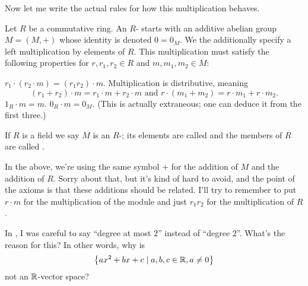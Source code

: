 Now let me write the actual rules for how this multiplication behaves.
\begin{definition}
	Let $R$ be a commutative ring.
	An $R$- starts with an additive abelian group $M = (M,+)$
	whose identity is denoted $0 = 0_M$.
	We the additionally specify a left multiplication by elements of $R$.
	This multiplication must satisfy the following properties
	for $r, r_1, r_2 \in R$ and $m, m_1, m_2 \in M$:
	\begin{enumerate}[(i)]
		\ii $r_1 \cdot (r_2 \cdot m) = (r_1r_2) \cdot m$.
		\ii Multiplication is distributive, meaning
		\[ (r_1+r_2) \cdot m = r_1 \cdot m + r_2 \cdot m
			\text{ and }
			r \cdot (m_1 + m_2) = r \cdot m_1 + r \cdot m_2. \]
		\ii $1_R \cdot m = m$.
		\ii $0_R \cdot m = 0_M$.
		(This is actually extraneous;
		one can deduce it from the first three.)
	\end{enumerate}
	If $R$ is a field we say $M$ is an $R$-;
	its elements are called 
	and the members of $R$ are called .
\end{definition}

\begin{abuse}
	In the above, we're using the same symbol $+$ for the addition of $M$
	and the addition of $R$.
	Sorry about that, but it's kind of hard to avoid, and the point
	of the axioms is that these additions should be related.
	I'll try to remember to put $r \cdot m$ for the multiplication of the module
	and just $r_1r_2$ for the multiplication of $R$.
\end{abuse}

\begin{ques}
	In ,
	I was careful to say ``degree at most $2$'' instead of ``degree $2$''.
	What's the reason for this?
	In other words, why is
	\[ \left\{ ax^2 + bx + c \mid a,b,c \in \mathbb R, a \neq 0  \right\} \]
	not an $\mathbb R$-vector space?
\end{ques}

